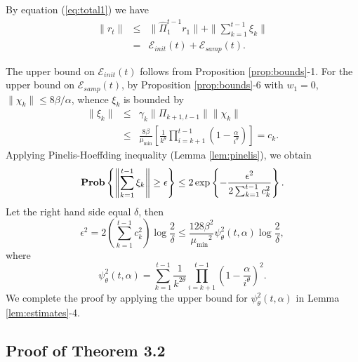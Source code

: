 \documentclass[twoside,twocolumn,journal]{IEEEtran}
\newenvironment{pf}[1][Proof]{\medskip\noindent\hspace{1em}{\itshape #1: }}{\hspace*{\fill}~\QED\par\endtrivlist\medskip}
\def\Err{{\mathscr E}}
\def\Prob{{\bf Prob}}
\def\amin{{\mu_{\min}} }
\begin{document}
\begin{pf}[Proof of Theorem \ref{thm:robmon}] By equation (\ref{eq:total1}) we have
\begin{eqnarray*}
\|r_{t}\| & \leq & \|\hat{\Pi}_1^{t-1} r_1\| + \| \sum_{k=1}^{t-1}\xi_k \|\\
& = & \Err_{init}(t)+\Err_{samp}(t).
\end{eqnarray*}

The upper bound on $\Err_{init}(t)$ follows from Proposition \ref{prop:bounds}-1. For the upper bound on $\Err_{samp}(t)$,
by Proposition \ref{prop:bounds}-6 with $w_1=0$, $\|\chi_k\|\leq 8\beta/\alpha$, whence $\xi_k$ is bounded by
\begin{eqnarray*}
\|\xi_k\| & \leq  & \gamma_k \|\Pi_{k+1,t-1}\| \|\chi_k \| \\
& \leq & \frac{8\beta}{\amin} \left[\frac{1}{k^\theta} \prod_{i=k+1}^{t-1} \left( 1- \frac{\alpha}{i^\theta}\right)\right] = c_k.
\end{eqnarray*}
Applying Pinelis-Hoeffding inequality (Lemma \ref{lem:pinelis}), we obtain
\[ \Prob \left\{ \left\|\sum_{k=1}^{t-1} \xi_k \right\| \geq \epsilon \right\} \leq
2 \exp \left\{-\frac{\epsilon^2}{2\sum_{k=1}^{t-1} c_k^2} \right\}. \]
Let the right hand side equal $\delta$, then
\[
\epsilon^2 = 2 \left(\sum_{k=1}^{t-1} c_k^2\right) \log \frac{2}{\delta} \leq \frac{128\beta^2}{\amin^2} \psi^2_{\theta}(t,\alpha) \log \frac{2}{\delta},
\]
where
\[ \psi^2_\theta(t,\alpha)= \sum_{k=1}^{t-1} \frac{1}{k^{2\theta}} \prod_{i=k+1}^{t-1} \left(1-\frac{\alpha}{i^\theta}\right)^2.\]
We complete the proof by applying the upper bound for $\psi^2_{\theta}(t,\alpha)$ in Lemma \ref{lem:estimates}-4.
\end{pf}

\subsection{Proof of Theorem 3.2}
\end{document}

